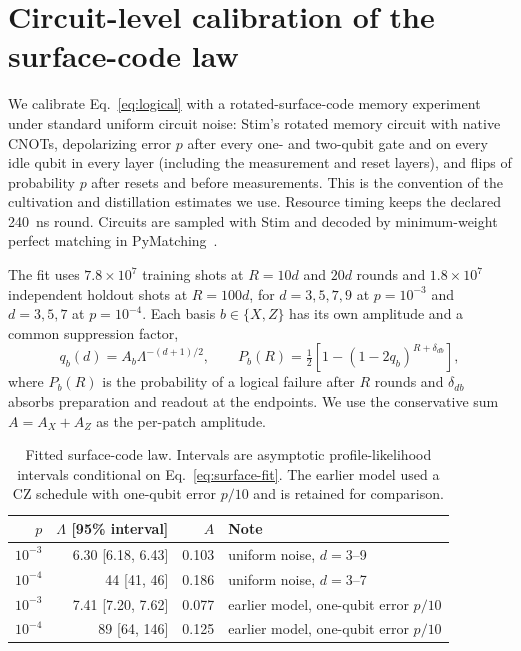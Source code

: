 \documentclass[11pt]{article}
\begin{document}
\section{Circuit-level calibration of the surface-code law}\label{app:surface}
We calibrate Eq.~\eqref{eq:logical} with a rotated-surface-code memory
experiment under standard uniform circuit noise: Stim's rotated memory circuit
with native CNOTs, depolarizing error $p$ after every one- and two-qubit gate and
on every idle qubit in every layer (including the measurement and reset layers),
and flips of probability $p$ after resets and before measurements. This is the
convention of the cultivation and distillation estimates we use. Resource timing
keeps the declared 240~ns round. Circuits are sampled with Stim and decoded by
minimum-weight perfect matching in PyMatching~\cite{gidney2021stim,higgott2023sparse}.

The fit uses $7.8\times10^7$ training shots at $R=10d$ and $20d$ rounds and
$1.8\times10^7$ independent holdout shots at $R=100d$, for $d=3,5,7,9$ at
$p=10^{-3}$ and $d=3,5,7$ at $p=10^{-4}$. Each basis $b\in\{X,Z\}$ has its own
amplitude and a common suppression factor,
\begin{equation}\label{eq:surface-fit}
 q_b(d)=A_b\Lambda^{-(d+1)/2},\qquad
 P_b(R)=\tfrac12\left[1-(1-2q_b)^{R+\delta_{db}}\right],
\end{equation}
where $P_b(R)$ is the probability of a logical failure after $R$ rounds and
$\delta_{db}$ absorbs preparation and readout at the endpoints. We use the
conservative sum $A=A_X+A_Z$ as the per-patch amplitude.

\begin{table}[h]
\centering
\small
\begin{tabular}{@{}rrrl@{}}
\toprule
$p$ & $\Lambda$ [95\% interval] & $A$ & Note\\
\midrule
$10^{-3}$ & 6.30 [6.18, 6.43] & 0.103 & uniform noise, $d=3$--9\\
$10^{-4}$ & 44 [41, 46] & 0.186 & uniform noise, $d=3$--7\\
$10^{-3}$ & 7.41 [7.20, 7.62] & 0.077 & earlier model, one-qubit error $p/10$\\
$10^{-4}$ & 89 [64, 146] & 0.125 & earlier model, one-qubit error $p/10$\\
\bottomrule
\end{tabular}
\caption{Fitted surface-code law. Intervals are asymptotic profile-likelihood
intervals conditional on Eq.~\eqref{eq:surface-fit}. The earlier model used a CZ
schedule with one-qubit error $p/10$ and is retained for comparison.}\label{tab:surface-fit}
\end{table}
\end{document}
